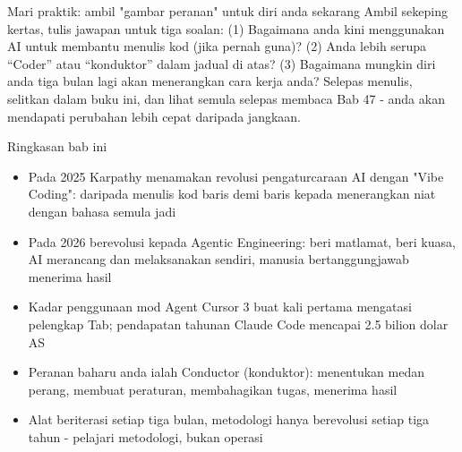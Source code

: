 \begin{tcbpractice}{Mari praktik: ambil "gambar peranan" untuk diri anda sekarang}
Ambil sekeping kertas, tulis jawapan untuk tiga soalan: (1) Bagaimana anda kini menggunakan AI untuk membantu menulis kod (jika pernah guna)? (2) Anda lebih serupa “Coder” atau “konduktor” dalam jadual di atas? (3) Bagaimana mungkin diri anda tiga bulan lagi akan menerangkan cara kerja anda? Selepas menulis, selitkan dalam buku ini, dan lihat semula selepas membaca Bab 47 - anda akan mendapati perubahan lebih cepat daripada jangkaan.

\end{tcbpractice}

\begin{tcbsummary}{Ringkasan bab ini}
\begin{itemize}
  \item Pada 2025 Karpathy menamakan revolusi pengaturcaraan AI dengan "Vibe Coding": daripada menulis kod baris demi baris kepada menerangkan niat dengan bahasa semula jadi
  \item Pada 2026 berevolusi kepada Agentic Engineering: beri matlamat, beri kuasa, AI merancang dan melaksanakan sendiri, manusia bertanggungjawab menerima hasil
  \item Kadar penggunaan mod Agent Cursor 3 buat kali pertama mengatasi pelengkap Tab; pendapatan tahunan Claude Code mencapai 2.5 bilion dolar AS
  \item Peranan baharu anda ialah Conductor (konduktor): menentukan medan perang, membuat peraturan, membahagikan tugas, menerima hasil
  \item Alat beriterasi setiap tiga bulan, metodologi hanya berevolusi setiap tiga tahun - pelajari metodologi, bukan operasi
\end{itemize}

\end{tcbsummary}
